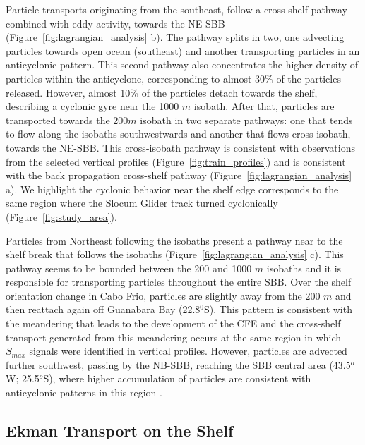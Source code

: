 \documentclass[draft]{agujournal2019}
\begin{document}
Particle transports originating from the southeast, follow a cross-shelf pathway combined with eddy activity, towards the NE-SBB (Figure~\ref{fig:lagrangian_analysis} b). The pathway splits in two, one advecting particles towards open ocean (southeast) and another transporting particles in an anticyclonic pattern. This second pathway also concentrates the higher density of particles within the anticyclone, corresponding to almost 30$\%$ of the particles released. However, almost 10$\%$ of the particles detach towards the shelf, describing a cyclonic gyre near the 1000 $m$ isobath. After that, particles are transported towards the 200$m$ isobath in two separate pathways: one that tends to flow along the isobaths southwestwards and another that flows cross-isobath, towards the NE-SBB. This cross-isobath pathway is consistent with observations from the selected vertical profiles (Figure~\ref{fig:train_profiles}) and is consistent with the back propagation cross-shelf pathway (Figure~\ref{fig:lagrangian_analysis} a). We highlight the cyclonic behavior near the shelf edge corresponds to the same region where the Slocum Glider track turned cyclonically (Figure~\ref{fig:study_area}).

Particles from Northeast following the isobaths present a pathway near to the shelf break that follows the isobaths (Figure~\ref{fig:lagrangian_analysis} c). This pathway seems to be bounded between the 200 and 1000 $m$ isobaths and it is responsible for transporting particles throughout the entire SBB. Over the shelf orientation change in Cabo Frio, particles are slightly away from the 200 $m$ and then reattach again off Guanabara Bay (22.8$^0$S). This pattern is consistent with the meandering that leads to the development of the CFE and the cross-shelf transport generated from this meandering occurs at the same region in which \textit{$S_{max}$} signals were identified in vertical profiles. However, particles are advected further southwest, passing by the NB-SBB, reaching the SBB central area (43.5$^o$W; 25.5$^o$S), where higher accumulation of particles are consistent with anticyclonic patterns in this region \cite{silveira2023}.

\subsection{Ekman Transport on the Shelf}
\label{sub:ekman}
\end{document}
